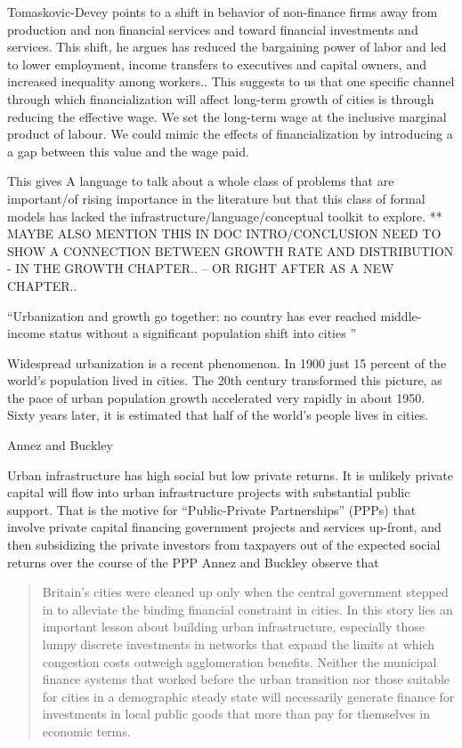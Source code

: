 Tomaskovic-Devey points to
a shift in behavior of non-finance firms away from production and non financial services and toward financial investments and services. This shift, he argues  has reduced the bargaining power of labor and led to lower employment, income transfers to executives and capital owners, and increased inequality among workers.\cite{tomaskovic-deveyFinancializationCausesInequality2013}. This suggests to us that one specific channel  through which financialization will affect long-term growth of cities is through reducing the effective wage. We set the long-term wage at the inclusive marginal product of labour. We could  mimic the effects of financialization by introducing a a gap between this value  and the wage paid. 

This gives 
A language to talk about a whole class of problems that are important/of rising importance in the literature but that this class of formal models has lacked the infrastructure/language/conceptual toolkit to explore. ** MAYBE ALSO MENTION THIS IN DOC INTRO/CONCLUSION
NEED TO SHOW A CONNECTION BETWEEN GROWTH RATE AND DISTRIBUTION - IN THE GROWTH CHAPTER.. -- OR RIGHT AFTER AS A NEW CHAPTER..

``Urbanization and growth go together: no country has ever reached middle- income status without a significant population shift into cities ''\cite{annezUrbanizationGrowthSetting2009}


\epigraph{Widespread urbanization is a recent phenomenon. In 1900 just 15 percent of the world’s population lived in cities. The 20th century transformed this picture, as the pace of urban population growth accelerated very rapidly in about 1950. Sixty years later, it is estimated that half of the world’s people lives in cities.}{Annez and Buckley\cite{annezUrbanizationGrowthSetting2009}}


Urban infrastructure has high social but low private returns. It is unlikely private capital will flow into urban infrastructure projects with substantial public support. That is the motive for ``\gls{Public-Private Partnerships}'' (PPPs) that involve private capital financing government projects and services up-front, and then subsidizing the private investors  from taxpayers out of the expected social returns over the course of the PPP
Annez and Buckley\cite{annezUrbanizationGrowthSetting2009} observe that 
\begin{quotation}
Britain’s cities were cleaned up only when the central government stepped in to alleviate the binding financial constraint in cities. In this story lies an important lesson about building urban infrastructure, especially those lumpy discrete investments in networks that expand the limits at which congestion costs outweigh agglomeration benefits. Neither the municipal finance systems that worked before the urban transition nor those suitable for cities in a demographic steady state will necessarily generate finance for investments in local public goods that more than pay for themselves in economic terms. 
\end{quotation}




